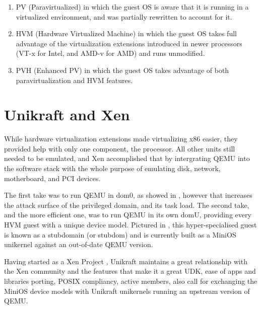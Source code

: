 \begin{enumerate}
  \item PV (Paravirtualized) in which the guest OS is aware that it is running in a virtualized environment, and was partially rewritten to account for it.
  \item HVM (Hardware Virtualized Machine) in which the guest OS takes full advantage of the virtualization extensions introduced in newer processors (VT-x for Intel, and AMD-v for AMD) and runs unmodified.
  \item PVH (Enhanced PV) in which the guest OS takes advantage of both paravirtualization and HVM features.
\end{enumerate}

\section{Unikraft and Xen}
\label{sec:unikraft-xen}

While hardware virtualization extensions made virtualizing x86 easier, they provided help with only one component, the processor.
All other units still needed to be emulated, and Xen accomplished that by intergrating QEMU into the software stack with the whole purpose of emulating disk, network, motherboard, and PCI devices.

The first take was to run QEMU in dom0, as showed in  , however that increases the attack surface of the privileged domain, and its task load.
The second take, and the more efficient one, was to run QEMU in its own domU, providing every HVM guest with a unique device model.
Pictured in , this hyper-specialised guest is known as a stubdomain (or stubdom) and is currently built as a MiniOS unikernel against an out-of-date QEMU version.


Having started as a Xen Project \cite{unikraft-xen}, Unikraft maintains a great relationship with the Xen community and the features that make it a great UDK, ease of apps and libraries porting, POSIX compliancy,  active members, also call for exchanging the MiniOS device models with Unikraft unikernels running an upstream version of QEMU.

